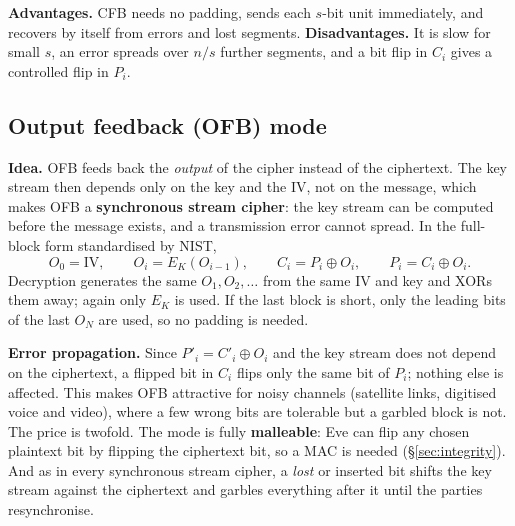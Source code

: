 \textbf{Advantages.} CFB needs no padding, sends each $s$-bit unit immediately, and recovers by itself from errors and lost segments. \textbf{Disadvantages.} It is slow for small $s$, an error spreads over $n/s$ further segments, and a bit flip in $C_i$ gives a controlled flip in $P_i$.

\subsection{Output feedback (OFB) mode \new}

\textbf{Idea.} OFB feeds back the \emph{output} of the cipher instead of the ciphertext. The key stream then depends only on the key and the IV, not on the message, which makes OFB a \textbf{synchronous stream cipher}: the key stream can be computed before the message exists, and a transmission error cannot spread. In the full-block form standardised by NIST,
\[
O_0 = \mathrm{IV}, \qquad O_i = E_K(O_{i-1}), \qquad C_i = P_i \oplus O_i, \qquad P_i = C_i \oplus O_i .
\]
Decryption generates the same $O_1, O_2, \dots$ from the same IV and key and XORs them away; again only $E_K$ is used. If the last block is short, only the leading bits of the last $O_N$ are used, so no padding is needed.

\begin{center}
\end{center}

\textbf{Error propagation.} Since $P'_i = C'_i \oplus O_i$ and the key stream does not depend on the ciphertext, a flipped bit in $C_i$ flips only the same bit of $P_i$; nothing else is affected. This makes OFB attractive for noisy channels (satellite links, digitised voice and video), where a few wrong bits are tolerable but a garbled block is not. The price is twofold. The mode is fully \textbf{malleable}: Eve can flip any chosen plaintext bit by flipping the ciphertext bit, so a MAC is needed (\S\ref{sec:integrity}). And as in every synchronous stream cipher, a \emph{lost} or inserted bit shifts the key stream against the ciphertext and garbles everything after it until the parties resynchronise.

